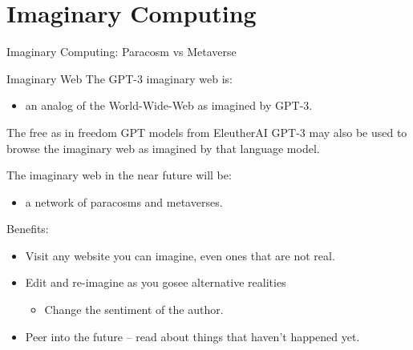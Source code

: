 \documentclass[presentation]{beamer}
\begin{document}
\section{Imaginary Computing}
\label{sec:org3dd2f40}
\begin{frame}[label={sec:org5c5f12b}]{Imaginary Computing: Paracosm vs Metaverse}
\begin{block}{Imaginary Web}
The GPT-3 imaginary web is:
\begin{itemize}
\item an analog of the World-Wide-Web as imagined by GPT-3.
\end{itemize}

The free as in freedom GPT models from
EleutherAI GPT-3 may also be used to browse
the imaginary web as imagined by that language model.

The imaginary web in the near future will be:
\begin{itemize}
\item a network of paracosms and metaverses.
\end{itemize}

Benefits:
\begin{itemize}
\item Visit any website you can imagine, even ones that are not real.
\item Edit and re-imagine as you gosee alternative realities
\begin{itemize}
\item Change the sentiment of the author.
\end{itemize}
\item Peer into the future – read about things that haven't happened yet.
\end{itemize}
\end{block}
\end{frame}
\end{document}
